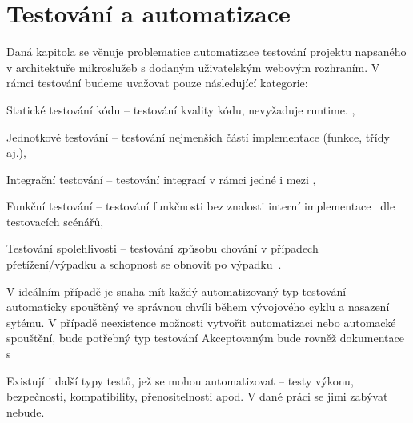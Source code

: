 \section{Testování a automatizace}\label{sec:testing}

Daná kapitola se věnuje problematice automatizace testování projektu napsaného v architektuře mikroslužeb s dodaným uživatelským webovým rozhraním.
V rámci testování budeme uvažovat pouze následující kategorie:

\begin{dl}
   \item[Statické testování kódu] – testování kvality kódu, nevyžaduje runtime. ,
   \item[Jednotkové testování] – testování nejmenších částí implementace (funkce, třídy aj.),
   \item[Integrační testování] – testování integrací v rámci jedné  i mezi ,
   \item[Funkční testování] – testování funkčnosti bez znalosti interní implementace~\cite{testtypes} dle testovacích scénářů,
   \item[Testování spolehlivosti] – testování způsobu chování v případech přetížení/výpadku a schopnost se obnovit po výpadku~\cite{testtypes2}.
\end{dl}

V ideálním případě je snaha mít každý automatizovaný typ testování automaticky spouštěný ve správnou chvíli během vývojového cyklu a nasazení sytému.
V případě neexistence možnosti vytvořit automatizaci nebo automacké spouštění, bude potřebný typ testování
Akceptovaným bude rovněž dokumentace s


Existují i další typy testů, jež se mohou automatizovat – testy výkonu, bezpečnosti, kompatibility, přenositelnosti apod.
V dané práci se jimi zabývat nebude.

